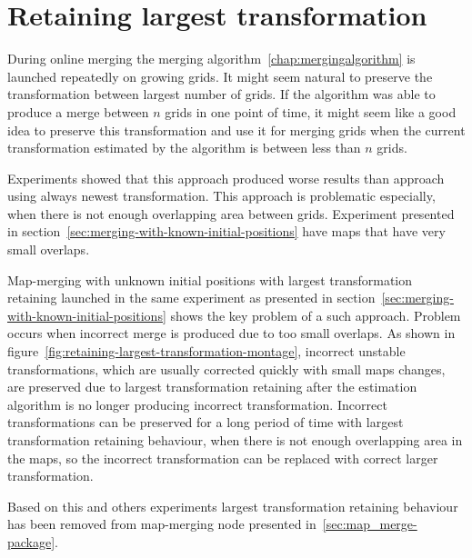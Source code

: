 \section{Retaining largest transformation}
\label{sec:retaining-largest-transformation}

During online merging the merging algorithm~\ref{chap:mergingalgorithm} is launched repeatedly on growing grids. It might seem natural to preserve the transformation between largest number of grids. If the algorithm was able to produce a merge between $n$ grids in one point of time, it might seem like a good idea to preserve this transformation and use it for merging grids when the current transformation estimated by the algorithm is between less than $n$ grids.

Experiments showed that this approach produced worse results than approach using always newest transformation. This approach is problematic especially, when there is not enough overlapping area between grids. Experiment presented in section~\ref{sec:merging-with-known-initial-positions} have maps that have very small overlaps.

Map-merging with unknown initial positions with largest transformation retaining launched in the same experiment as presented in section~\ref{sec:merging-with-known-initial-positions} shows the key problem of a such approach. Problem occurs when incorrect merge is produced due to too small overlaps. As shown in figure~\ref{fig:retaining-largest-transformation-montage}, incorrect unstable transformations, which are usually corrected quickly with small maps changes, are preserved due to largest transformation retaining after the estimation algorithm is no longer producing incorrect transformation. Incorrect transformations can be preserved for a long period of time with largest transformation retaining behaviour, when there is not enough overlapping area in the maps, so the incorrect transformation can be replaced with correct larger transformation.

Based on this and others experiments largest transformation retaining behaviour has been removed from map-merging node presented in~\ref{sec:map_merge-package}.

